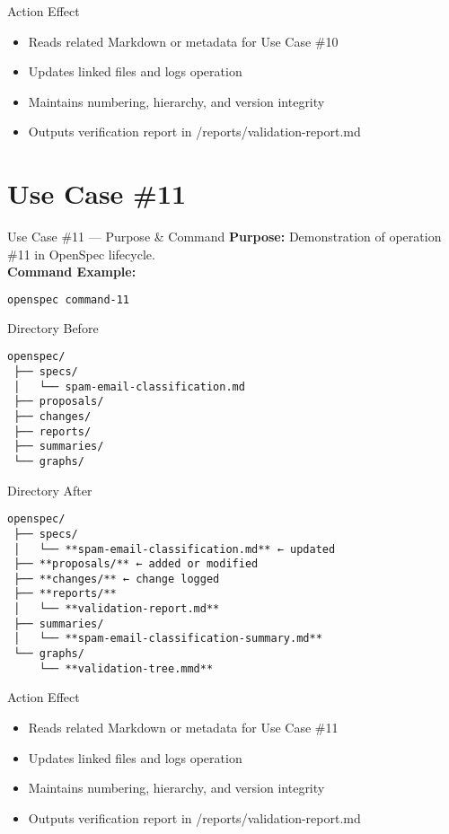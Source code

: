 \documentclass[aspectratio=169]{beamer}
\begin{document}
\begin{frame}{Action Effect}
\begin{itemize}
  \item Reads related Markdown or metadata for Use Case \#10
  \item Updates linked files and logs operation
  \item Maintains numbering, hierarchy, and version integrity
  \item Outputs verification report in /reports/validation-report.md
\end{itemize}
\end{frame}

\section*{Use Case \#11}
\begin{frame}{Use Case \#11 --- Purpose \& Command}
\textbf{Purpose:} Demonstration of operation \#11 in OpenSpec lifecycle.\\[4pt]
\textbf{Command Example:}
\begin{lstlisting}[language=bash]
openspec command-11
\end{lstlisting}
\end{frame}

\begin{frame}{Directory Before}
\begin{lstlisting}
openspec/
 ├── specs/
 │   └── spam-email-classification.md
 ├── proposals/
 ├── changes/
 ├── reports/
 ├── summaries/
 └── graphs/
\end{lstlisting}
\end{frame}

\begin{frame}{Directory After}
\begin{lstlisting}
openspec/
 ├── specs/
 │   └── **spam-email-classification.md** ← updated
 ├── **proposals/** ← added or modified
 ├── **changes/** ← change logged
 ├── **reports/**
 │   └── **validation-report.md**
 ├── summaries/
 │   └── **spam-email-classification-summary.md**
 └── graphs/
     └── **validation-tree.mmd**
\end{lstlisting}
\end{frame}

\begin{frame}{Action Effect}
\begin{itemize}
  \item Reads related Markdown or metadata for Use Case \#11
  \item Updates linked files and logs operation
  \item Maintains numbering, hierarchy, and version integrity
  \item Outputs verification report in /reports/validation-report.md
\end{itemize}
\end{frame}
\end{document}
